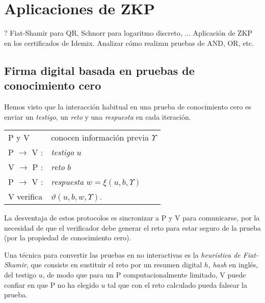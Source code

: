 \chapter{Aplicaciones de ZKP}\label{ch:aplicaciones} 


?
Fiat-Shamir para QR, Schnorr para logaritmo discreto, ...
Aplicación de ZKP en los certificados de Idemix. Analizar cómo realizan pruebas de AND, OR, etc.








\section{Firma digital basada en pruebas de conocimiento cero}

Hemos visto que la interacción habitual en una prueba de conocimiento cero es enviar un \textit{testigo}, un \textit{reto} y una \textit{respuesta} en cada iteración.

\begin{center}
	\begin{tabular}{ll}
		P y V & conocen información previa $\Upsilon$
		\\
		P $\rightarrow$ V :& \textit{testigo} $u$
		\\
		V $\rightarrow$ P :& \textit{reto} $b$
		\\
		P $\rightarrow$ V :& \textit{respuesta} $w = \xi(u,b,\Upsilon)$
		\\
		V verifica & $\vartheta(u,b,w,\Upsilon)$.
	\end{tabular}
\end{center}

\hfil

La desventaja de estos protocolos es sincronizar a P y V para comunicarse, por la necesidad de que el verificador debe generar el reto para estar seguro de la prueba (por la propiedad de conocimiento cero).

Una técnica para convertir las pruebas en no interactivas es la \textit{heurística de Fiat-Shamir}, que consiste en sustituir el reto por un resumen digital $h$, \textit{hash} en inglés, del testigo $u$, de modo que para un P computacionalmente limitado, V puede confiar en que P no ha elegido $u$ tal que con el reto calculado pueda falsear la prueba.

